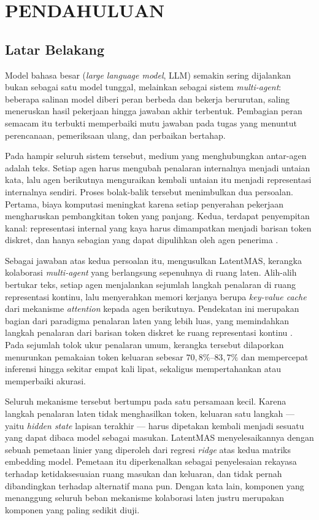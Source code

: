 \setcounter{page}{1}
\chapter{PENDAHULUAN}

\section{Latar Belakang}

Model bahasa besar (\textit{large language model}, LLM) semakin sering
dijalankan bukan sebagai satu model tunggal, melainkan sebagai sistem
\textit{multi-agent}: beberapa salinan model diberi peran berbeda dan bekerja
berurutan, saling meneruskan hasil pekerjaan hingga jawaban akhir terbentuk.
Pembagian peran semacam itu terbukti memperbaiki mutu jawaban pada tugas yang
menuntut perencanaan, pemeriksaan ulang, dan perbaikan bertahap.

Pada hampir seluruh sistem tersebut, medium yang menghubungkan antar-agen
adalah teks. Setiap agen harus mengubah penalaran internalnya menjadi untaian
kata, lalu agen berikutnya menguraikan kembali untaian itu menjadi representasi
internalnya sendiri. Proses bolak-balik tersebut menimbulkan dua persoalan.
Pertama, biaya komputasi meningkat karena setiap penyerahan pekerjaan
mengharuskan pembangkitan token yang panjang. Kedua, terdapat penyempitan
kanal: representasi internal yang kaya harus dimampatkan menjadi barisan token
diskret, dan hanya sebagian yang dapat dipulihkan oleh agen penerima
\citep{latentmas, cache2cache}.

Sebagai jawaban atas kedua persoalan itu, \citet{latentmas} mengusulkan
LatentMAS, kerangka kolaborasi \textit{multi-agent} yang berlangsung sepenuhnya
di ruang laten. Alih-alih bertukar teks, setiap agen menjalankan sejumlah
langkah penalaran di ruang representasi kontinu, lalu menyerahkan memori
kerjanya berupa \textit{key-value cache} dari mekanisme \textit{attention}
\citep{vaswani} kepada agen berikutnya. Pendekatan ini merupakan bagian dari
paradigma penalaran laten yang lebih luas, yang memindahkan langkah penalaran
dari barisan token diskret ke ruang representasi kontinu \citep{coconut,
latentsurvey}. Pada sejumlah tolok ukur penalaran umum, kerangka tersebut
dilaporkan menurunkan pemakaian token keluaran sebesar $70{,}8\%$--$83{,}7\%$
dan mempercepat inferensi hingga sekitar empat kali lipat, sekaligus
mempertahankan atau memperbaiki akurasi.

Seluruh mekanisme tersebut bertumpu pada satu persamaan kecil. Karena langkah
penalaran laten tidak menghasilkan token, keluaran satu langkah --- yaitu
\textit{hidden state} lapisan terakhir --- harus dipetakan kembali menjadi
sesuatu yang dapat dibaca model sebagai masukan. LatentMAS menyelesaikannya
dengan sebuah pemetaan linier yang diperoleh dari regresi \textit{ridge}
\citep{ridge} atas kedua matriks embedding model. Pemetaan itu diperkenalkan
sebagai penyelesaian rekayasa terhadap ketidaksesuaian ruang masukan dan
keluaran, dan tidak pernah dibandingkan terhadap alternatif mana pun. Dengan
kata lain, komponen yang menanggung seluruh beban mekanisme kolaborasi laten
justru merupakan komponen yang paling sedikit diuji.

